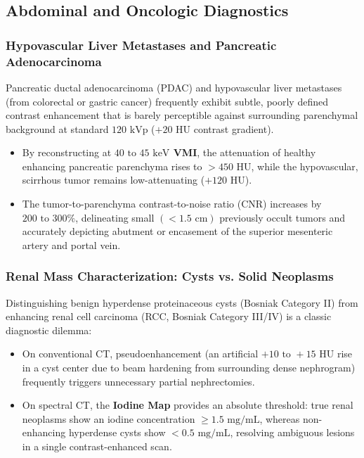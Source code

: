 \documentclass[11pt,a4paper]{article}
\begin{document}
\subsection{Abdominal and Oncologic Diagnostics}

\subsubsection{Hypovascular Liver Metastases and Pancreatic Adenocarcinoma}
Pancreatic ductal adenocarcinoma (PDAC) and hypovascular liver metastases (from colorectal or gastric cancer) frequently exhibit subtle, poorly defined contrast enhancement that is barely perceptible against surrounding parenchymal background at standard $120\text{ kVp}$ ($+20\text{ HU}$ contrast gradient).
\begin{itemize}[leftmargin=2em]
    \item By reconstructing at \textbf{$40\text{ to }45\text{ keV}$ VMI}, the attenuation of healthy enhancing pancreatic parenchyma rises to $> 450\text{ HU}$, while the hypovascular, scirrhous tumor remains low-attenuating ($+120\text{ HU}$).
    \item The tumor-to-parenchyma contrast-to-noise ratio (CNR) increases by \textbf{$200\text{ to }300\%$}, delineating small $(< 1.5\text{ cm})$ previously occult tumors and accurately depicting abutment or encasement of the superior mesenteric artery and portal vein.
\end{itemize}

\subsubsection{Renal Mass Characterization: Cysts vs. Solid Neoplasms}
Distinguishing benign hyperdense proteinaceous cysts (Bosniak Category II) from enhancing renal cell carcinoma (RCC, Bosniak Category III/IV) is a classic diagnostic dilemma:
\begin{itemize}[leftmargin=2em]
    \item On conventional CT, pseudoenhancement (an artificial $+10\text{ to }+15\text{ HU}$ rise in a cyst center due to beam hardening from surrounding dense nephrogram) frequently triggers unnecessary partial nephrectomies.
    \item On spectral CT, the \textbf{Iodine Map} provides an absolute threshold: true renal neoplasms show an iodine concentration \textbf{$\ge 1.5\text{ mg/mL}$}, whereas non-enhancing hyperdense cysts show \textbf{$< 0.5\text{ mg/mL}$}, resolving ambiguous lesions in a single contrast-enhanced scan.
\end{itemize}
\end{document}
